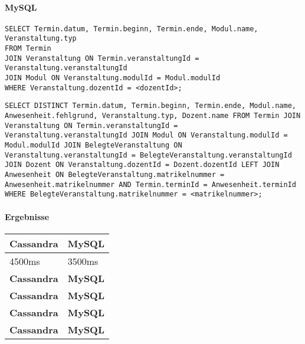 \paragraph{MySQL}
\begin{lstlisting}
SELECT Termin.datum, Termin.beginn, Termin.ende, Modul.name, Veranstaltung.typ
FROM Termin
JOIN Veranstaltung ON Termin.veranstaltungId = Veranstaltung.veranstaltungId
JOIN Modul ON Veranstaltung.modulId = Modul.modulId
WHERE Veranstaltung.dozentId = <dozentId>;
\end{lstlisting} 
\begin{lstlisting}
SELECT DISTINCT Termin.datum, Termin.beginn, Termin.ende, Modul.name, Anwesenheit.fehlgrund, Veranstaltung.typ, Dozent.name FROM Termin JOIN Veranstaltung ON Termin.veranstaltungId = Veranstaltung.veranstaltungId JOIN Modul ON Veranstaltung.modulId = Modul.modulId JOIN BelegteVeranstaltung ON Veranstaltung.veranstaltungId = BelegteVeranstaltung.veranstaltungId JOIN Dozent ON Veranstaltung.dozentId = Dozent.dozentId LEFT JOIN Anwesenheit ON BelegteVeranstaltung.matrikelnummer = Anwesenheit.matrikelnummer AND Termin.terminId = Anwesenheit.terminId WHERE BelegteVeranstaltung.matrikelnummer = <matrikelnummer>; 
\end{lstlisting} 

\vspace{6pt}

\paragraph{Ergebnisse}
\begin{tabular}{|p{5cm}|p{5cm}|}
	\hline
	\textbf{Cassandra} & \textbf{MySQL}\\
	\hline
	4500ms & 3500ms\\
	\hline
	\textbf{Cassandra} & \textbf{MySQL}\\
	\hline
	\textbf{Cassandra} & \textbf{MySQL}\\
	\hline
	\textbf{Cassandra} & \textbf{MySQL}\\
	\hline
	\textbf{Cassandra} & \textbf{MySQL}\\
	\hline
\end{tabular}
